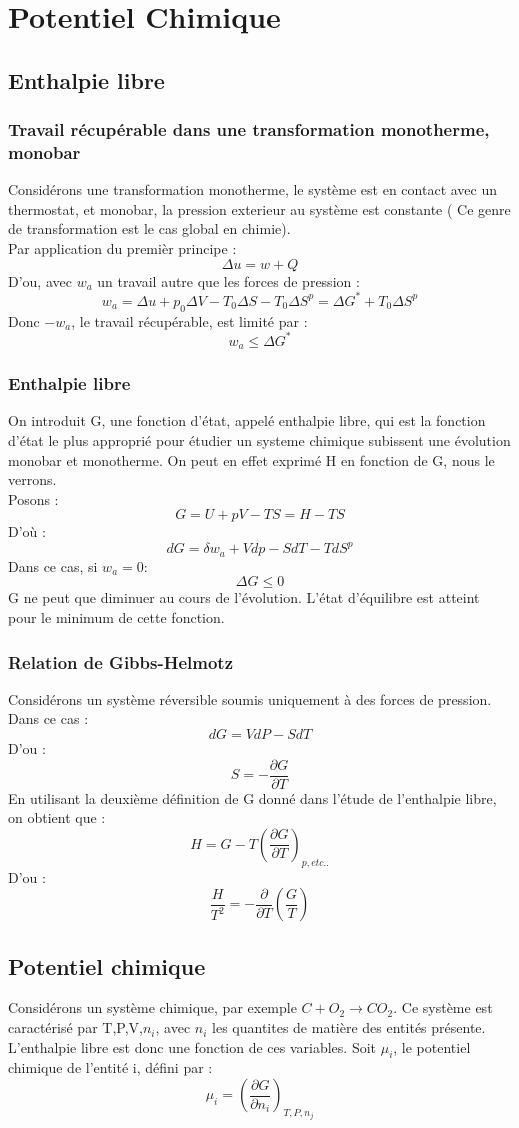 \chapter{Potentiel Chimique}
\section{Enthalpie libre}
\subsection{Travail récupérable dans une transformation monotherme, monobar}
Considérons une transformation monotherme, le système est en contact avec un thermostat, et monobar, la pression exterieur au système est constante ( Ce genre de transformation est le cas global en chimie).\\
Par application du premièr principe : 
$$\Delta u = w + Q$$
D'ou, avec $w_a$ un travail autre que les forces de pression :
$$w_a = \Delta u + p_0\Delta V - T_0 \Delta S - T_0 \Delta S^p = \Delta G^* + T_0 \Delta S^p$$
Donc $-w_a$, le travail récupérable, est limité par : 
$$w_a \leq \Delta G^*$$
\subsection{Enthalpie libre}
On introduit G, une fonction d'état, appelé enthalpie libre, qui est la fonction d'état le plus approprié pour étudier un systeme chimique subissent une évolution monobar et monotherme. On peut en effet exprimé H en fonction de G, nous le verrons.\\
Posons : 
$$G = U + pV - TS = H - TS$$
D'où :
$$dG = \delta w_a + Vdp - SdT - TdS^p$$
Dans ce cas, si $w_a = 0$: 
$$\Delta G \leq 0$$
G ne peut que diminuer au cours de l'évolution. L'état d'équilibre est atteint pour le minimum de cette fonction.
\subsection{Relation de Gibbs-Helmotz}
Considérons un système réversible soumis uniquement à des forces de pression.\\
Dans ce cas :
$$dG = VdP - SdT$$
D'ou : 
$$S = -\dfrac{\partial G}{\partial T}$$
En utilisant la deuxième définition de G donné dans l'étude de l'enthalpie libre, on obtient que : 
$$H = G - T\left( \dfrac{\partial G}{\partial T}\right)_{p,etc..} $$
D'ou : 
$$\dfrac{H}{T^2} = -\dfrac{\partial}{\partial T } \left(\dfrac{G}{T} \right) $$
\section{Potentiel chimique}
\begin{de}
Considérons un système chimique, par exemple $C + O_2 \rightarrow CO_2$. Ce système est caractérisé par T,P,V,$n_i$, avec $n_i$ les quantites de matière des entités présente.\\
L'enthalpie libre est donc une fonction de ces variables. Soit $\mu_i$, le potentiel chimique de l'entité i, défini par : 
$$\mu_i = \left( \dfrac{\partial G}{\partial n_i}\right)_{T,P,n_j} $$
\end{de}
